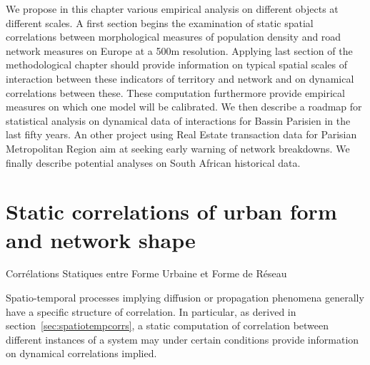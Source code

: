 

We propose in this chapter various empirical analysis on different objects at different scales. A first section begins the examination of static spatial correlations between morphological measures of population density and road network measures on Europe at a 500m resolution. Applying last section of the methodological chapter should provide information on typical spatial scales of interaction between these indicators 
 of territory and network and on dynamical correlations between these. These computation furthermore provide empirical measures on which one model will be calibrated. We then describe a roadmap for statistical analysis on dynamical data of interactions for Bassin Parisien in the last fifty years. An other project using Real Estate transaction data for Parisian Metropolitan Region aim at seeking early warning of network breakdowns. We finally describe potential analyses on South African historical data. 






\newpage

\section{Static correlations of urban form and network shape}{Corrélations Statiques entre Forme Urbaine et Forme de Réseau}



Spatio-temporal processes implying diffusion or propagation phenomena generally have a specific structure of correlation. In particular, as derived in section~\ref{sec:spatiotempcorrs}, a static computation of correlation between different instances of a system may under certain conditions provide information on dynamical correlations implied.


